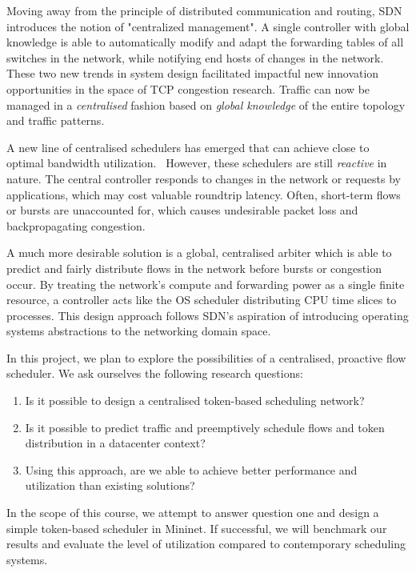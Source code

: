 \documentclass[sigconf]{acmart}
\begin{document}
Moving away from the principle of distributed communication and routing, SDN introduces the notion of "centralized management". A single controller with global knowledge is able to automatically modify and adapt the forwarding tables of all switches in the network, while notifying end hosts of changes in the network.
These two new trends in system design facilitated impactful new innovation opportunities in the space of TCP congestion research. Traffic can now be managed in a  \textit{centralised} fashion based on \textit{global knowledge} of the entire topology and traffic patterns.

A new line of centralised schedulers has emerged that  can achieve close to optimal bandwidth utilization.~\cite{hedera, fastpass, microte, b4, dionysus}
However, these schedulers are still  \textit{reactive}  in nature. The central controller responds to changes in the network or requests by applications, which may cost valuable roundtrip latency. Often, short-term flows or bursts are unaccounted for, which causes undesirable packet loss and backpropagating congestion. 

A much more desirable solution is a global, centralised arbiter which is able to predict and fairly distribute flows in the network before bursts or congestion occur. By treating the network's compute and forwarding power as a single finite resource, a controller acts like the OS scheduler distributing CPU time slices to processes. This design approach follows SDN's aspiration of introducing operating systems abstractions to the networking domain space.

In this project, we plan to explore the possibilities of a centralised, proactive flow scheduler. We ask ourselves the following research questions:
\begin{enumerate}
	\item Is it possible to design a centralised token-based scheduling network?
	\item Is it possible to predict traffic and preemptively schedule flows and token distribution in a datacenter context?
	\item Using this approach, are we able to achieve better performance and utilization than existing solutions?
\end{enumerate}

In the scope of this course, we attempt to answer question one and design a simple token-based scheduler in Mininet. If successful, we will benchmark our results and evaluate the level of utilization compared to contemporary scheduling systems.
\end{document}

